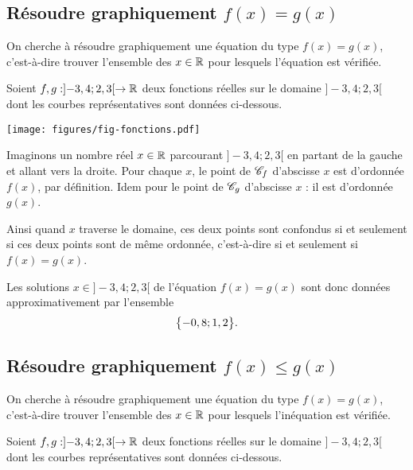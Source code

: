 

\subsection*{Résoudre graphiquement $f(x) = g(x)$}

On cherche à résoudre graphiquement une équation du type $f(x)=g(x)$, c'est-à-dire trouver l'ensemble des $x\in\mathbb{R}$ pour lesquels l'équation est vérifiée.

Soient $f,g : ]{-}3,4 ; 2,3[ \rightarrow \mathbb{R}$ deux fonctions réelles sur le domaine $]{-}3,4 ; 2,3[$ dont les courbes représentatives sont données ci-dessous.

	\begin{center}
	 \texttt{[image: figures/fig-fonctions.pdf]}
	\end{center}
	
Imaginons un nombre réel $x\in\mathbb{R}$ parcourant $]{-}3,4 ; 2,3[$ en partant de la gauche et allant vers la droite.
Pour chaque $x$, le point de $\mathcal{C}_f$ d'abscisse $x$ est d'ordonnée $f(x)$, par définition.
Idem pour le point de $\mathcal{C}_g$ d'abscisse $x$ : il est d'ordonnée $g(x)$.

Ainsi quand $x$ traverse le domaine, ces deux points sont confondus si et seulement si ces deux points sont de même ordonnée, c'est-à-dire si et seulement si $f(x) = g(x)$.		
	
Les solutions $x\in]{-}3,4 ; 2,3[$ de l'équation $f(x) = g(x)$ sont donc données approximativement par l'ensemble
	\[ \bigl\{  -0,8 ; 1,2  \bigr\}. \]



\subsection*{Résoudre graphiquement $f(x) \leq g(x)$}

On cherche à résoudre graphiquement une équation du type $f(x)=g(x)$, c'est-à-dire trouver l'ensemble des $x\in\mathbb{R}$ pour lesquels l'inéquation est vérifiée.

Soient $f,g : ]{-}3,4 ; 2,3[ \rightarrow \mathbb{R}$ deux fonctions réelles sur le domaine $]{-}3,4 ; 2,3[$ dont les courbes représentatives sont données ci-dessous.

